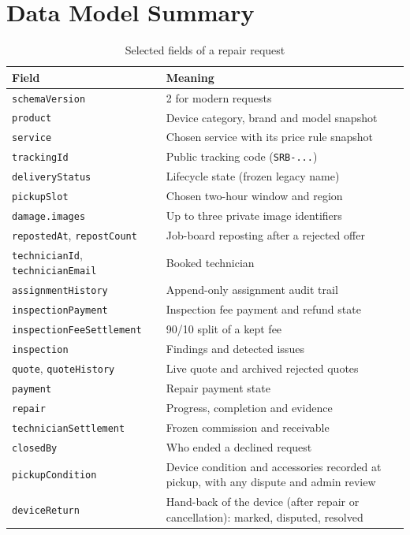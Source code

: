 \documentclass{standalone}
\begin{document}
\chapter{Data Model Summary}
\label{app:data}
\begin{table}[htbp]
\centering
\caption{Selected fields of a repair request}
\label{tab:fields}
\small
\begin{tabularx}{\textwidth}{@{}p{4.4cm}X@{}}
\toprule
\textbf{Field} & \textbf{Meaning} \\
\midrule
\texttt{schemaVersion} & 2 for modern requests \\
\texttt{product} & Device category, brand and model snapshot \\
\texttt{service} & Chosen service with its price rule snapshot \\
\texttt{trackingId} & Public tracking code (\texttt{SRB-...}) \\
\texttt{deliveryStatus} & Lifecycle state (frozen legacy name) \\
\texttt{pickupSlot} & Chosen two-hour window and region \\
\texttt{damage.images} & Up to three private image identifiers \\
\texttt{repostedAt}, \texttt{repostCount} & Job-board reposting after a rejected offer \\
\texttt{technicianId}, \texttt{technicianEmail} & Booked technician \\
\texttt{assignmentHistory} & Append-only assignment audit trail \\
\texttt{inspectionPayment} & Inspection fee payment and refund state \\
\texttt{inspectionFeeSettlement} & 90/10 split of a kept fee \\
\texttt{inspection} & Findings and detected issues \\
\texttt{quote}, \texttt{quoteHistory} & Live quote and archived rejected quotes \\
\texttt{payment} & Repair payment state \\
\texttt{repair} & Progress, completion and evidence \\
\texttt{technicianSettlement} & Frozen commission and receivable \\
\texttt{closedBy} & Who ended a declined request \\
\texttt{pickupCondition} & Device condition and accessories recorded at pickup, with any dispute and admin review \\
\texttt{deviceReturn} & Hand-back of the device (after repair or cancellation): marked, disputed, resolved \\
\bottomrule
\end{tabularx}
\end{table}
\end{document}
